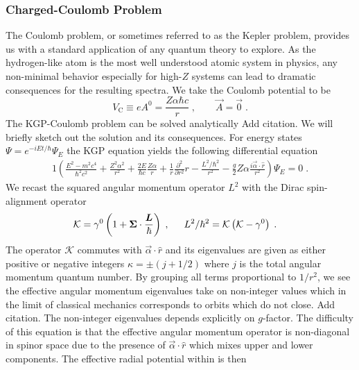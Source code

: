 \subsubsection{Charged-Coulomb Problem}\label{ajsss:coulomb}
The Coulomb problem, or sometimes referred to as the Kepler problem, provides us with a standard application of any quantum theory to explore. As the hydrogen-like atom is the most well understood atomic system in physics, any non-minimal behavior especially for high-$Z$ systems can lead to dramatic consequences for the resulting spectra. We take the Coulomb potential to be
\begin{equation}
	\label{eq:coulomb:01} V_\mathrm{C}\equiv e A^{0}=\frac{Z \alpha\hbar c}{r}\;,\qquad \vec{A}=\vec{0}\;.
\end{equation}
The KGP-Coulomb problem can be solved analytically {\color{red}Add citation.} We will briefly sketch out the solution and its consequences. For energy states $\Psi=e^{-iEt/\hbar}\Psi_{E}$ the KGP equation yields the following differential equation
\begin{alignat}{1}
	\label{cou02} \left(\frac{E^{2}-m^{2}c^{4}}{\hbar^{2}c^{2}}+\frac{Z^{2}\alpha^{2}}{r^{2}}+\frac{2E}{\hbar c}\frac{Z\alpha}{r}+\frac{1}{r}\frac{\partial^{2}}{\partial r^{2}}r-\frac{L^{2}/\hbar^{2}}{r^{2}}-\frac{g}{2}Z\alpha\frac{i\vec{\alpha}\cdot\hat{r}}{r^{2}}\right)\Psi_{E}=0\;.
\end{alignat}
We recast the squared angular momentum operator $L^{2}$ with the Dirac spin-alignment operator
\begin{alignat}{1}
\label{cou04} &\mathcal{K}=\gamma^{0}\left(1+\bb{\Sigma}\cdot\frac{\bb{L}}{\hbar}\right)\;,\indent L^{2}/\hbar^{2}=\mathcal{K}\left(\mathcal{K}-\gamma^{0}\right)\;.
\end{alignat}
The operator $\mathcal{K}$ commutes with $\vec{\alpha}\cdot\hat{r}$ and its eigenvalues are given as either positive or negative integers $\kappa=\pm(j+1/2)$ where $j$ is the total angular momentum quantum number. By grouping all terms proportional to $1/r^{2}$, we see the effective angular momentum eigenvalues take on non-integer values which in the limit of classical mechanics corresponds to orbits which do not close. {\color{red}Add citation.} The non-integer eigenvalues depends explicitly on $g$-factor. The difficulty of this equation is that the effective angular momentum operator is non-diagonal in spinor space due to the presence of $\vec{\alpha}\cdot\hat{r}$ which mixes upper and lower components. The effective radial potential within  is then
